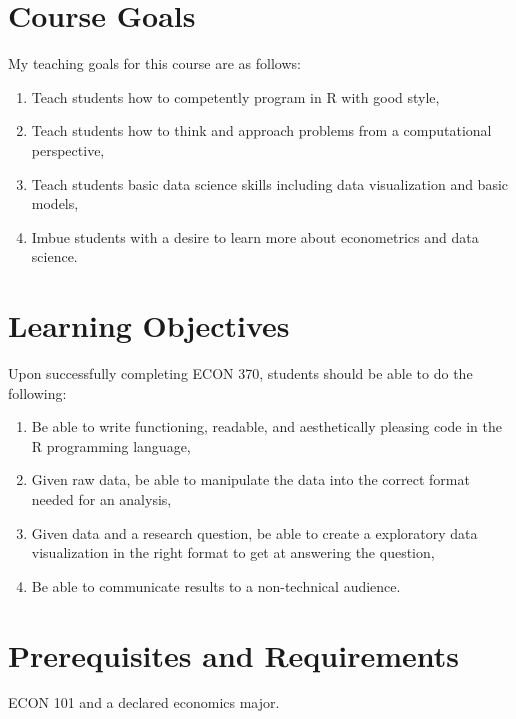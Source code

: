 \documentclass[11pt]{article}
\newcommand{\CourseNum}{370\xspace}         %
\begin{document}
\section*{Course Goals}
My teaching goals for this course are as follows:

\begin{enumerate}
    \item Teach students how to competently program in R with good style,
    \item Teach students how to think and approach problems from a computational perspective,
    \item Teach students basic data science skills including data visualization and basic models,
    \item Imbue students with a desire to learn more about econometrics and data science.
\end{enumerate}


\section*{Learning Objectives}
Upon successfully completing ECON \CourseNum, students should be able to do the following:

\begin{enumerate}
    \item Be able to write functioning, readable, and aesthetically pleasing code in the R programming language, 
    \item Given raw data, be able to manipulate the data into the correct format needed for an analysis,
    \item Given data and a research question, be able to create a exploratory data visualization in the right format to get at answering the question,
    \item Be able to communicate results to a non-technical audience.
\end{enumerate}


\section*{Prerequisites and Requirements}
ECON 101 and a declared economics major.
\end{document}
